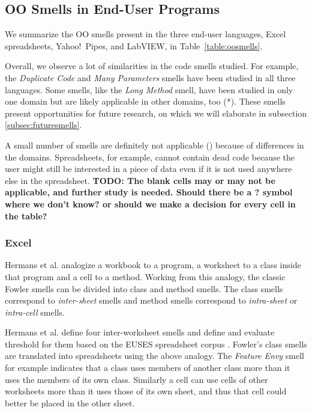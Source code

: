 \documentclass[10pt,conference,compsocconf]{IEEEtran}
\newcommand{\todo}[1]{\textbf{TODO: #1}}
\begin{document}
\subsection{OO Smells in End-User Programs}
 We summarize the OO smells present in the three end-user languages, Excel spreadsheets, Yahoo!\ Pipes, and LabVIEW, in Table~\ref{table:oosmells}.
 
 Overall, we observe a lot of similarities in the code smells studied. For example, the \emph{Duplicate Code} and \emph{Many Parameters} smells have been studied in all three languages. Some smells, like the \emph{Long Method} smell, have been studied in only one domain but are likely applicable in other domains, too (*). These smells present opportunities for future research, on which we will elaborate in subsection \ref{subsec:futuresmells}.
 
 A small number of smells are definitely not applicable () because of differences in the domains. Spreadsheets, for example, cannot contain dead code because the user might still be interested in a piece of data even if it is not used anywhere else in the spreadsheet.
\todo{The blank cells may or may not be applicable, and further study is needed. Should there be a ? symbol where we don't know? or should we make a decision for every cell in the table?}
 
 \subsubsection{Excel}
Hermans et al. \cite{Hermans2012inter} \cite{Hermans2012intra} analogize a workbook to a program, a worksheet to a class inside that program and a cell to a method.
Working from this analogy, the classic Fowler smells can be divided into class and method smells.
The class smells correspond to \textit{inter-sheet} smells and method smells correspond to \textit{intra-sheet} or \textit{intra-cell} smells.

Hermans et al. \cite{Hermans2012inter} define four inter-worksheet smells and define and evaluate threshold for them based on the EUSES spreadsheet corpus \cite{fisher2005euses}.
Fowler's class smells are translated into spreadsheets using the above analogy. 
The \textit{Feature Envy} smell for example indicates that a class uses members of another class more than it uses the members of its own class.
Similarly a cell can use cells of other worksheets more than it uses those of its own sheet, and thus that cell could better be placed in the other sheet.
\end{document}

